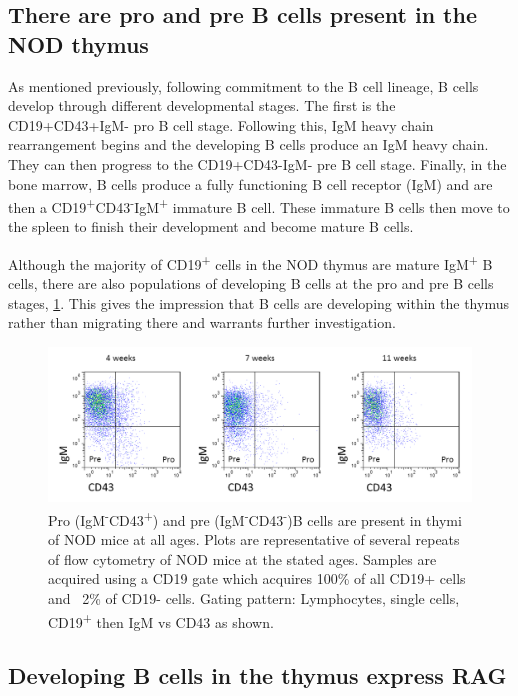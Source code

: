 \subsection{There are pro and pre B cells present in the NOD thymus}


As mentioned previously, following commitment to the B cell lineage, B cells develop through different developmental stages.
The first is the CD19+CD43+IgM- pro B cell stage.
Following this, IgM heavy chain rearrangement begins and the developing B cells produce an IgM heavy chain. 
They can then progress to the CD19+CD43-IgM- pre B cell stage.
Finally, in the bone marrow, B cells produce a fully functioning B cell receptor (IgM) and are then a CD19\textsuperscript{+}CD43\textsuperscript{-}IgM\textsuperscript{+} immature B cell.
These immature B cells then move to the spleen to finish their development and become mature B cells.

Although the majority of CD19\textsuperscript{+} cells in the NOD thymus are mature IgM\textsuperscript{+} B cells, there are also populations of developing B cells at the pro and pre B cells stages, \cref{fig:propre}.
This gives the impression that B cells are developing within the thymus rather than migrating there and warrants further investigation. 


\begin{figure}
	\includegraphics[width=\textwidth]{Figures/NODpropre.png}
	\caption{Pro (IgM\textsuperscript{-}CD43\textsuperscript{+}) and pre (IgM\textsuperscript{-}CD43\textsuperscript{-})B cells are present in thymi of NOD mice at all ages. Plots are representative of several repeats of flow cytometry of NOD mice at the stated ages. Samples are acquired using a CD19 gate which acquires 100\% of all CD19+ cells and ~2\% of CD19- cells. Gating pattern: Lymphocytes, single cells, CD19\textsuperscript{+} then IgM vs CD43 as shown.}
	\label{fig:propre}
\end{figure}

\subsection{Developing B cells in the thymus express RAG}



